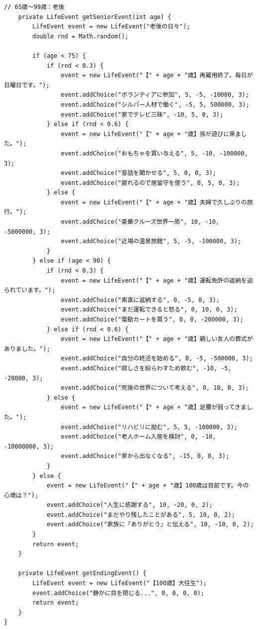 \documentclass[a4paper,11pt]{jsarticle}
\begin{document}
\begin{lstlisting}[caption=GameLogic.java]
    // 65歳〜99歳：老後
    private LifeEvent getSeniorEvent(int age) {
        LifeEvent event = new LifeEvent("老後の日々");
        double rnd = Math.random();

        if (age < 75) {
            if (rnd < 0.3) {
                event = new LifeEvent("【" + age + "歳】再雇用終了。毎日が日曜日です。");
                event.addChoice("ボランティアに参加", 5, -5, -10000, 3);
                event.addChoice("シルバー人材で働く", -5, 5, 500000, 3);
                event.addChoice("家でテレビ三昧", -10, 5, 0, 3);
            } else if (rnd < 0.6) {
                event = new LifeEvent("【" + age + "歳】孫が遊びに来ました。");
                event.addChoice("おもちゃを買い与える", 5, -10, -100000, 3);
                event.addChoice("昔話を聞かせる", 5, 0, 0, 3);
                event.addChoice("疲れるので居留守を使う", 0, 5, 0, 3);
            } else {
                event = new LifeEvent("【" + age + "歳】夫婦で久しぶりの旅行。");
                event.addChoice("豪華クルーズ世界一周", 10, -10, -5000000, 3);
                event.addChoice("近場の温泉旅館", 5, -5, -100000, 3);
            }
        } else if (age < 90) {
            if (rnd < 0.3) {
                event = new LifeEvent("【" + age + "歳】運転免許の返納を迫られています。");
                event.addChoice("素直に返納する", 0, -5, 0, 3);
                event.addChoice("まだ運転できると怒る", 0, 10, 0, 3);
                event.addChoice("電動カートを買う", 0, 0, -200000, 3);
            } else if (rnd < 0.6) {
                event = new LifeEvent("【" + age + "歳】親しい友人の葬式がありました。");
                event.addChoice("自分の終活を始める", 0, -5, -500000, 3);
                event.addChoice("寂しさを紛らわすため飲む", -10, -5, -20000, 3);
                event.addChoice("死後の世界について考える", 0, 10, 0, 3);
            } else {
                event = new LifeEvent("【" + age + "歳】足腰が弱ってきました。");
                event.addChoice("リハビリに励む", 5, 5, -100000, 3);
                event.addChoice("老人ホーム入居を検討", 0, -10, -10000000, 3);
                event.addChoice("家から出なくなる", -15, 0, 0, 3);
            }
        } else {
            event = new LifeEvent("【" + age + "歳】100歳は目前です。今の心境は？");
            event.addChoice("人生に感謝する", 10, -20, 0, 2);
            event.addChoice("まだやり残したことがある", 5, 10, 0, 2);
            event.addChoice("家族に「ありがとう」と伝える", 10, -10, 0, 2);
        }
        return event;
    }

    private LifeEvent getEndingEvent() {
        LifeEvent event = new LifeEvent("【100歳】大往生");
        event.addChoice("静かに目を閉じる...", 0, 0, 0, 0);
        return event;
    }
}
\end{lstlisting}
\end{document}
